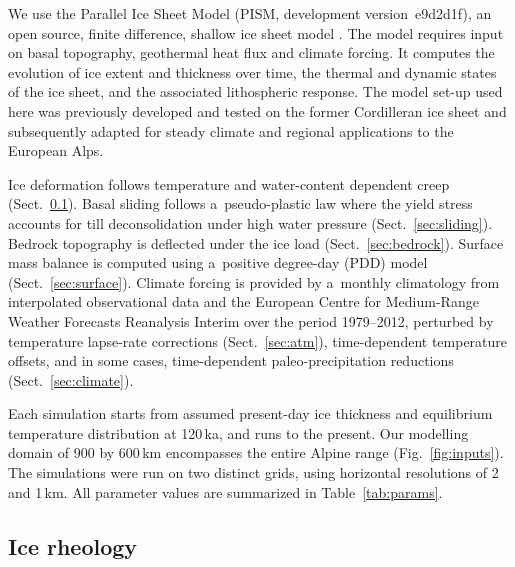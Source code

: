 \documentclass[tc, manuscript]{copernicus}
\begin{document}
    We use the Parallel Ice Sheet Model (PISM, development version~e9d2d1f), an
    open source, finite difference, shallow ice sheet model
    \citep{PISM-authors.2017}. The model requires input on basal
    topography, geothermal heat flux and climate forcing. It computes the
    evolution of ice extent and thickness over time, the thermal and dynamic
    states of the ice sheet, and the associated lithospheric response. The
    model set-up used here was previously developed and tested on the former
    Cordilleran ice sheet \citep{Seguinot.2014, Seguinot.etal.2014,
    Seguinot.etal.2016} and subsequently adapted for steady climate
    \citep{Becker.etal.2016} and regional \citep{Jouvet.etal.2017a}
    applications to the European Alps.

    Ice deformation follows temperature and water-content dependent creep
    (Sect.~\ref{sec:icedyn}). Basal sliding follows a~pseudo-plastic law where
    the yield stress accounts for till deconsolidation under high water
    pressure (Sect.~\ref{sec:sliding}). Bedrock topography is deflected
    under the ice load (Sect.~\ref{sec:bedrock}). Surface mass balance is
    computed using a~positive degree-day (PDD) model (Sect.~\ref{sec:surface}).
    Climate forcing is provided by a~monthly climatology from interpolated
    observational data \citep[WorldClim;][]{Hijmans.etal.2005} and the European
    Centre for Medium-Range Weather Forecasts Reanalysis Interim
    \citep[ERA-Interim;][]{Dee.etal.2011} over the period 1979--2012,
    perturbed by temperature lapse-rate
    corrections (Sect.~\ref{sec:atm}), time-dependent temperature offsets, and
    in some cases, time-dependent paleo-precipitation reductions
    (Sect.~\ref{sec:climate}).

    Each simulation starts from assumed present-day ice thickness and
    equilibrium temperature distribution at 120\,\unit{ka}, and runs to the
    present. Our modelling domain of 900 by 600\,\unit{km} encompasses the
    entire Alpine range (Fig.~\ref{fig:inputs}). The simulations were run on
    two distinct grids, using horizontal resolutions of 2 and 1\,\unit{km}.
    All parameter values are summarized in Table~\ref{tab:params}.


\subsection{Ice rheology}
\label{sec:icedyn}
\end{document}
